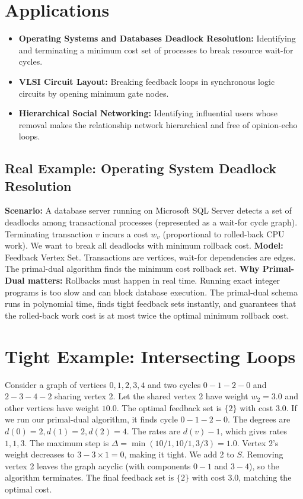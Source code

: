 \section{Applications}
\begin{itemize}
    \item \textbf{Operating Systems and Databases Deadlock Resolution:} Identifying and terminating a minimum cost set of processes to break resource wait-for cycles.
    \item \textbf{VLSI Circuit Layout:} Breaking feedback loops in synchronous logic circuits by opening minimum gate nodes.
    \item \textbf{Hierarchical Social Networking:} Identifying influential users whose removal makes the relationship network hierarchical and free of opinion-echo loops.
\end{itemize}

\subsection*{Real Example: Operating System Deadlock Resolution}
\textbf{Scenario:} A database server running on Microsoft SQL Server detects a set of deadlocks among transactional processes (represented as a wait-for cycle graph). Terminating transaction $v$ incurs a cost $w_v$ (proportional to rolled-back CPU work). We want to break all deadlocks with minimum rollback cost.
\textbf{Model:} Feedback Vertex Set. Transactions are vertices, wait-for dependencies are edges. The primal-dual algorithm finds the minimum cost rollback set.
\textbf{Why Primal-Dual matters:} Rollbacks must happen in real time. Running exact integer programs is too slow and can block database execution. The primal-dual schema runs in polynomial time, finds tight feedback sets instantly, and guarantees that the rolled-back work cost is at most twice the optimal minimum rollback cost.

\section{Tight Example: Intersecting Loops}
Consider a graph of vertices $0, 1, 2, 3, 4$ and two cycles $0-1-2-0$ and $2-3-4-2$ sharing vertex 2. Let the shared vertex 2 have weight $w_2 = 3.0$ and other vertices have weight $10.0$.
The optimal feedback set is $\{2\}$ with cost 3.0.
If we run our primal-dual algorithm, it finds cycle $0-1-2-0$. The degrees are $d(0)=2, d(1)=2, d(2)=4$. The rates are $d(v)-1$, which gives rates $1, 1, 3$.
The maximum step is $\Delta = \min(10/1, 10/1, 3/3) = 1.0$.
Vertex 2's weight decreases to $3 - 3 \times 1 = 0$, making it tight. We add 2 to $S$.
Removing vertex 2 leaves the graph acyclic (with components $0-1$ and $3-4$), so the algorithm terminates.
The final feedback set is $\{2\}$ with cost 3.0, matching the optimal cost.

